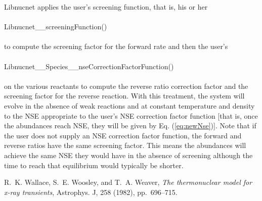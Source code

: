 \documentclass{article}    %
\def\apj{Astrophys. J}
\begin{document}
Libnucnet applies the user's screening function, that is, his or her\\
\\
Libnucnet\_\_screeningFunction()\\
\\
to compute the screening
factor for the forward rate and then the user's\\
\\
Libnucnet\_\_Species\_\_nseCorrectionFactorFunction()\\
\\
on the various reactants to compute the reverse ratio correction factor
and the screening factor for the
reverse reaction.  With this treatment, the system will evolve in the
absence of weak reactions and at constant temperature and
density to the NSE appropriate
to the user's NSE correction factor function [that is, once the abundances
reach NSE, they will be given by Eq. (\ref{eq:newNse})].  Note that if the
user does not supply an NSE correction factor function, the forward and
reverse ratios have the same screening factor.
This means the abundances will achieve the same NSE they would have in the
absence of screening although the time to reach that equilibrium would
typically be shorter.


\begin{thebibliography}{1}

{\sc R.~K. {Wallace}, S.~E. {Woosley}, and T.~A. {Weaver}}, {\em The
  thermonuclear model for x-ray transients}, \apj, 258 (1982), pp.~696--715.

\end{thebibliography}
\end{document}
